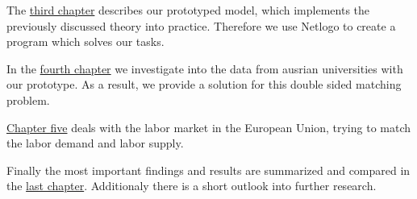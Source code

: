 The \hyperref[prototype]{third chapter} describes our prototyped model, which implements the previously discussed theory into practice. 
Therefore we use Netlogo to create a program which solves our tasks.

In the \hyperref[evaluation_students]{fourth chapter} we investigate into the data from ausrian universities with our prototype. 
As a result, we provide a solution for this double sided matching problem.

\hyperref[evaluation_labor]{Chapter five} deals with the labor market in the European Union, trying to match the labor demand and labor supply. 

Finally the most important findings and results are summarized and compared in the \hyperref[summary]{last chapter}.
Additionaly there is a short outlook into further research.